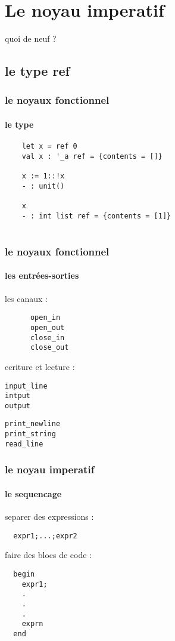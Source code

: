 \section{Le noyau imperatif}

\begin{frame}
quoi de neuf ? 
\end{frame}
\subsection{le type ref}
\begin{frame}[fragile]
  \frametitle{le noyaux fonctionnel}
  \framesubtitle{le type}
  \begin{lstlisting}
    let x = ref 0 
    val x : '_a ref = {contents = []}
   
    x := 1::!x
    - : unit()
     
    x
    - : int list ref = {contents = [1]}
     
  \end{lstlisting}
\end{frame} 
\begin{frame}[fragile]
  \frametitle{le noyaux fonctionnel}
  \framesubtitle{les entrées-sorties}
    les canaux : 
  \begin{lstlisting}
      open_in
      open_out
      close_in
      close_out
  \end{lstlisting}
    ecriture et lecture :
    \begin{minipage}[t]{4cm}
  \begin{lstlisting}
input_line
intput
output
  \end{lstlisting}
\end{minipage}
  \begin{minipage}[t]{4cm}
    \begin{lstlisting}
print_newline
print_string
read_line
      \end{lstlisting}
    \end{minipage}
\end{frame}

\begin{frame}[fragile]
  \frametitle{le noyau imperatif}
  \framesubtitle{le sequencage}
  separer des expressions :
  \begin{lstlisting}
  expr1;...;expr2
  \end{lstlisting}
  faire des blocs de code :
  \begin{lstlisting}
  begin
    expr1; 
    .
    .
    .
    exprn
  end
  \end{lstlisting}
\end{frame}

